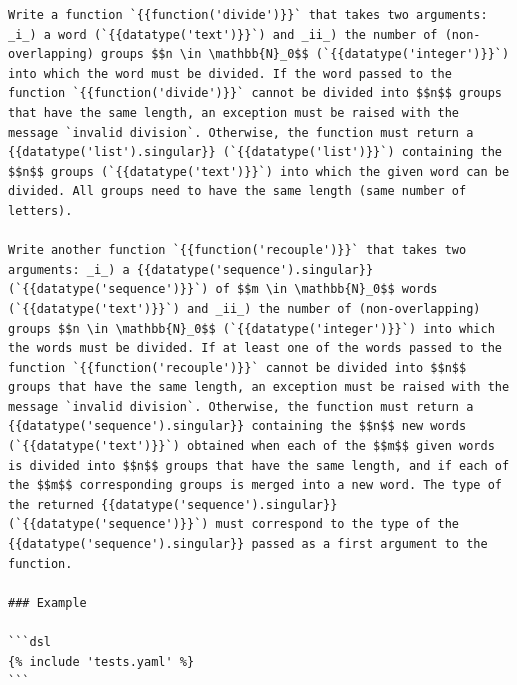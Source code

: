 \documentclass[../main]{subfiles}
\begin{document}
\begin{listing}
    \begin{verbatim}
Write a function `{{function('divide')}}` that takes two arguments: _i_) a word (`{{datatype('text')}}`) and _ii_) the number of (non-overlapping) groups $$n \in \mathbb{N}_0$$ (`{{datatype('integer')}}`) into which the word must be divided. If the word passed to the function `{{function('divide')}}` cannot be divided into $$n$$ groups that have the same length, an exception must be raised with the message `invalid division`. Otherwise, the function must return a {{datatype('list').singular}} (`{{datatype('list')}}`) containing the $$n$$ groups (`{{datatype('text')}}`) into which the given word can be divided. All groups need to have the same length (same number of letters).

Write another function `{{function('recouple')}}` that takes two arguments: _i_) a {{datatype('sequence').singular}} (`{{datatype('sequence')}}`) of $$m \in \mathbb{N}_0$$ words (`{{datatype('text')}}`) and _ii_) the number of (non-overlapping) groups $$n \in \mathbb{N}_0$$ (`{{datatype('integer')}}`) into which the words must be divided. If at least one of the words passed to the function `{{function('recouple')}}` cannot be divided into $$n$$ groups that have the same length, an exception must be raised with the message `invalid division`. Otherwise, the function must return a {{datatype('sequence').singular}} containing the $$n$$ new words (`{{datatype('text')}}`) obtained when each of the $$m$$ given words is divided into $$n$$ groups that have the same length, and if each of the $$m$$ corresponding groups is merged into a new word. The type of the returned {{datatype('sequence').singular}} (`{{datatype('sequence')}}`) must correspond to the type of the {{datatype('sequence').singular}} passed as a first argument to the function.

### Example

```dsl
{% include 'tests.yaml' %}
```
    \end{verbatim}
    \caption[]{
        Language-agnostic task description for the \textit{Recoupling} exercise.
        The Kramdown-flavored Markdown contains Jinja2 placeholders for function names and both formal and informal names of data types.
        The task description ends with some examples that illustrate how the two functions should be used.
        The sample code is denoted using the same specification of the test suite for the programming exercise in TESTed-DSL format (\cref{lst:recouple-example}).
    }
    \label{lst:task-description-markdown}
\end{listing}
\end{document}
